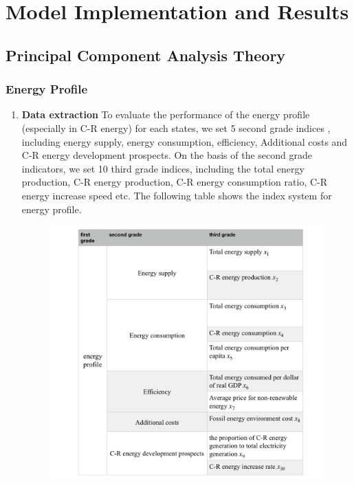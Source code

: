 \documentclass{mcmthesis}
\begin{document}
\section{Model Implementation and Results}
    \subsection{Principal Component Analysis Theory}
        \subsubsection{Energy Profile}

        \begin{enumerate}
          \item \textbf{Data extraction}
            To evaluate the performance of the energy profile (especially in C-R energy) for each states, we set 5 second grade indices , including energy supply, energy consumption, efficiency, Additional costs and C-R energy development prospects. On the basis of the second grade indicators, we set 10 third grade indices, including the total energy production, C-R energy production, C-R energy consumption ratio, C-R energy increase speed etc. The following table shows the index system for energy profile.

            \begin{figure}
              \centering
              \includegraphics[width=400px]{ener.png}
            \end{figure}


\end{enumerate}
\end{document}
